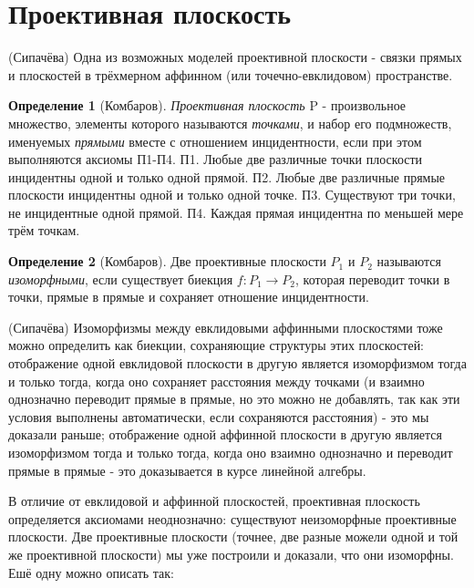 \documentclass[a4paper, 12pt]{article}
\theoremstyle{definition}
\newtheorem*{definition}{Определение}
\begin{document}
\section{Проективная плоскость}
(Сипачёва) Одна из возможных моделей проективной плоскости - связки прямых и плоскостей в трёхмерном аффинном (или точечно-евклидовом) пространстве.
\begin{definition}[Комбаров]
    \textit{Проективная плоскость} P - произвольное множество, элементы которого называются \textit{точками}, и набор его подмножеств, именуемых \textit{прямыми} вместе с отношением инцидентности, если при этом выполняются аксиомы П1-П4. \newline
    П1. Любые две различные точки плоскости инцидентны одной и только одной прямой. \newline
    П2. Любые две различные прямые плоскости инцидентны одной и только одной точке. \newline
    П3. Существуют три точки, не инцидентные одной прямой. \newline
    П4. Каждая прямая инцидентна по меньшей мере трём точкам.
\end{definition}

\begin{definition}[Комбаров]
    Две проективные плоскости $P_1$ и $P_2$ называются \textit{изоморфными}, если существует биекция $f: P_1 \to P_2$, которая переводит точки в точки, прямые в прямые и сохраняет отношение инцидентности.
\end{definition}

(Сипачёва) Изоморфизмы между евклидовыми аффинными плоскостями тоже можно определить как биекции, сохраняющие структуры этих плоскостей: отображение одной евклидовой плоскости в другую является изоморфизмом тогда и только тогда, когда оно сохраняет расстояния между точками (и взаимно однозначно переводит прямые в прямые, но это можно не добавлять, так как эти условия выполнены автоматически, если сохраняются расстояния) - это мы доказали раньше; отображение одной аффинной плоскости в другую является изоморфизмом тогда и только тогда, когда оно взаимно однозначно и переводит прямые в прямые - это доказывается в курсе линейной алгебры.

В отличие от евклидовой и аффинной плоскостей, проективная плоскость определяется аксиомами неоднозначно: существуют неизоморфные проективные плоскости. Две проективные плоскости (точнее, две разные можели одной и той же проективной плоскости) мы уже построили и доказали, что они изоморфны. Ешё одну можно описать так:
\end{document}
